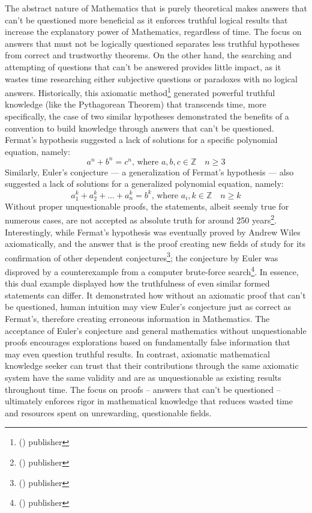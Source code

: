 \documentclass[a4paper,12pt]{article}
\newcommand{\citefoot}[1]{\footnote{\citeall{#1}}}
\newcommand{\citeall}[1]{\citeauth{#1} \citetitle{#1} (\citeyear{#1}) publisher \citelist{#1}{publisher}}
\begin{document}
The abstract nature of Mathematics that is purely theoretical makes answers that can't be questioned more beneficial as it enforces truthful logical results that increase the explanatory power of Mathematics, regardless of time. The focus on answers that must not be logically questioned separates less truthful hypotheses from correct and trustworthy theorems. On the other hand, the searching and attempting of questions that can’t be answered provides little impact, as it wastes time researching either subjective questions or paradoxes with no logical answers. Historically, this axiomatic method\citefoot{axiomatic} generated powerful truthful knowledge (like the Pythagorean Theorem) that transcends time, more specifically, the case of two similar hypotheses demonstrated the benefits of a convention to build knowledge through answers that can’t be questioned. Fermat's hypothesis suggested a lack of solutions for a specific polynomial equation, namely:
\[
a^n + b^n = c^n, \, \text{where} \,\, a, b, c \in \mathbb{Z} \quad n \ge 3
\]
Similarly, Euler’s conjecture --- a generalization of Fermat’s hypothesis --- also suggested a lack of solutions for a generalized polynomial equation, namely:
\[
a_1^k+a_2^k + ... + a_n^k = b^k, \, \text{where} \,\, a_i, k \in \mathbb{Z} \quad n \ge k
\]
Without proper unquestionable proofs, the statements, albeit seemly true for numerous cases, are not accepted as absolute truth for around 250 years\citefoot{eulers}. Interestingly, while Fermat's hypothesis was eventually proved by Andrew Wiles axiomatically, and the answer that is the proof creating new fields of study for its confirmation of other dependent conjectures\citefoot{wiles_1995}; the conjecture by Euler was disproved by a counterexample from a computer brute-force search\citefoot{lander_parkin_1966}. In essence, this dual example displayed how the truthfulness of even similar formed statements can differ. It demonstrated how without an axiomatic proof that can’t be questioned, human intuition may view Euler’s conjecture just as correct as Fermat's, therefore creating erroneous information in Mathematics. The acceptance of Euler’s conjecture and general mathematics without unquestionable proofs encourages explorations based on fundamentally false information that may even question truthful results. In contrast, axiomatic mathematical knowledge seeker can trust that their contributions through the same axiomatic system have the same validity and are as unquestionable as existing results throughout time. The focus on proofs – answers that can’t be questioned – ultimately enforces rigor in mathematical knowledge that reduces wasted time and resources spent on unrewarding, questionable fields.
\end{document}
